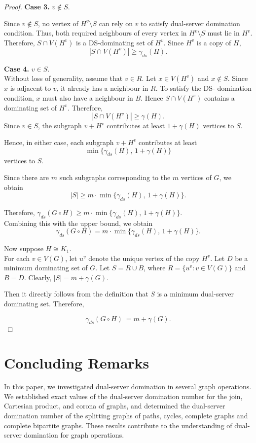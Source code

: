 \documentclass{article}
\begin{document}
\begin{proof}
\textbf{Case 3.} $v\notin S$.

  Since $v\notin S$, no vertex of $H^v\setminus S$ can rely on $v$ to satisfy dual-server domination condition. Thus, both required neighbours of every vertex in $H^{v}\setminus S$ must lie in $H^v$. Therefore, $
S\cap V(H^{v})$
is a DS-dominating set of $H^{v}$. Since $H^{v}$ is a copy of $H$,
\[
|S\cap V(H^{v})|\ge\gamma_{ds}(H).
\]

\textbf{Case 4.}  $v\in S$.\\
Without loss of generality, assume that $v\in R$. Let $x\in V(H^v)$ and  $x\notin S$. Since $x$ is adjacent to $v$, it already has a neighbour in $R$. To satisfy the DS- domination condition, $x$ must also have a neighbour in $B$. Hence $
S\cap V(H^{v})$
contains a dominating set of $H^{v}$. Therefore,
\[
|S\cap V(H^{v})|\ge\gamma(H).
\]
Since $v\in S$, the subgraph $v+H^{v}$ contributes at least $
1+\gamma(H)$
vertices to $S$.

Hence, in either case, each subgraph $v+H^{v}$ contributes at least
\[
\min\{\gamma_{ds}(H),\,1+\gamma(H)\}
\]
vertices to $S$.

Since there are $m$ such subgraphs corresponding to the $m$ vertices of $G$, we obtain
\[
|S|\ge
m \cdot \min\{\gamma_{ds}(H),\,1+\gamma(H)\}.
\]

Therefore, $\gamma_{ds}(G\circ H)\ge
m \cdot \min\{\gamma_{ds}(H),\,1+\gamma(H)\}.$\\
Combining this with the upper bound, we obtain \[\gamma_{ds}(G\circ H)= 
m \cdot \min\{\gamma_{ds}(H),\,1+\gamma(H)\}.\]



Now suppose $H\cong K_{1}$.\\ For each $v\in V(G)$, let $u^{v}$ denote the unique  vertex  of the copy $H^v$.
Let $D$ be a minimum dominating set of $G$. Let
$ S=R\cup B$,
where $
R=\{u^{v}:v\in V(G)\}$ and $
B=D$.
Clearly, $
|S|=m+\gamma(G)$.

Then it directly follows from the definition that $S$ is a minimum dual-server dominating set. Therefore, 

\[
\gamma_{ds}(G\circ H)\ = m+\gamma(G).
\]
\end{proof}

\section*{Concluding Remarks}

In this paper, we investigated dual-server domination in several graph operations. We established exact values of the dual-server domination number for the join, Cartesian product, and corona of graphs, and determined the dual-server domination number of the splitting graphs of paths, cycles, complete graphs and complete bipartite graphs. These results contribute to the understanding of dual-server domination for graph operations.
\end{document}
